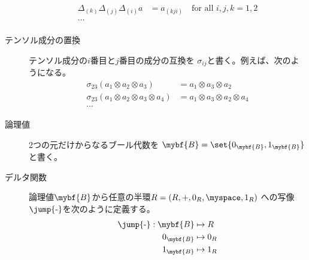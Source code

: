 \begin{description}
\begin{equation*}
\begin{split}
		\Delta_{(k)}\Delta_{(j)}\Delta_{(i)}a &= a_{(kji)} \quad\text{for all }i,j,k=1,2 \\
		\dots \\
	\end{split}\end{equation*} %
	\item[テンソル成分の置換]テンソル成分の$i$番目と$j$番目の成分の互換を
	$\sigma_{ij}$と書く。例えば、次のようになる。
	\begin{equation*}\begin{split} %
		\sigma_{23}(a_1\otimes a_2\otimes a_3) 
		&= a_1\otimes a_3\otimes a_2 \\
		\sigma_{23}(a_1\otimes a_2\otimes a_3\otimes a_4) 
		&= a_1\otimes a_3\otimes a_2\otimes a_4 \\
		\cdots
	\end{split}\end{equation*} %
	\item[論理値]2つの元だけからなるブール代数を
	$\mybf{B}=\set{0_{\mybf{B}},1_{\mybf{B}}}$と書く。
	\item[デルタ関数]論理値$\mybf{B}$から任意の半環$R=(R,+,0_R,\myspace,1_R)$
	への写像$\jump{\mathchar`-}$を次のように定義する。
	\begin{equation*}\begin{split} %
		\jump{\mathchar`-}: \mybf{B} &\mapsto R \\
		0_{\mybf{B}} &\mapsto 0_R \\
		1_{\mybf{B}} &\mapsto 1_R \\
	\end{split}\end{equation*} %
\end{description} %
